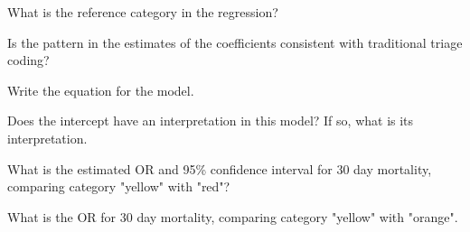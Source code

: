 {\begin{parts}
\item What is the reference category in the regression?

\item Is the pattern in the estimates of the coefficients consistent with traditional triage coding?

\item Write the equation for the model.

\item Does the intercept have an interpretation in this model?  If so, what is its interpretation.

\item What is the estimated OR and 95\% confidence interval for 30 day mortality, comparing category "yellow" with "red"?

\item What is the OR for 30 day mortality, comparing category "yellow" with "orange".

\end{parts}

}{}

